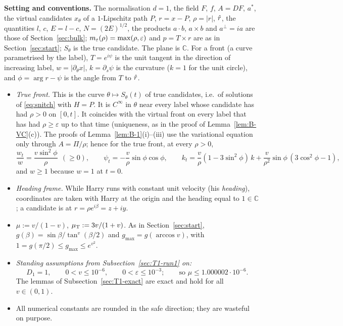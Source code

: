 \medskip\noindent\textbf{Setting and conventions.} The normalisation $d=1$, the field $F$, $f$, $A=DF$, $a^*$, the virtual candidates
$x_\theta$ of a $1$-Lipschitz path $P$, $r=x-P$, $\rho=|r|$, $\hat r$, the quantities $l$, $c$, $E=l-c$, $N=(2E)^{1/2}$, the products
$a\cdot b$, $a\times b$ and $a^\perp=ia$ are those of Section~\ref{sec:bulk}; $m_\varepsilon(\rho)=\max(\rho,\varepsilon)$ and
$p=T\times r$ are as in Section~\ref{sec:start}; $S_\theta$ is the true candidate. The plane is $\mathbb C$. For a front (a curve
parametrised by the label), $T=e^{i\psi}$ is the unit tangent in the direction of increasing label, $w=|\partial_\theta x|$,
$k=\partial_s\psi$ is the curvature ($k=1$ for the unit circle), and $\phi=\arg r-\psi$ is the angle from $T$ to $\hat r$.
\begin{itemize}
\item \emph{True front.} This is the curve $\theta\mapsto S_\theta(t)$ of true candidates, i.e.\ of solutions of \eqref{eq:snitch} with
$H=P$. It is $C^\infty$ in $\theta$ near every label whose candidate has had $\rho>0$ on $[0,t]$. It coincides with the virtual front on
every label that has had $\rho\ge\varepsilon$ up to that time (uniqueness, as in the proof of Lemma~\ref{lem:B-VC}(c)). The proofs of
Lemma~\ref{lem:B-1}(i)--(iii) use the variational equation only through $A=\Pi/\rho$; hence for the true front, at every $\rho>0$,
\begin{equation}\label{eq:T1-laws}
\frac{w_t}w=\frac{v\sin^2\!\phi}\rho\ \ (\ge0),\qquad\psi_t=-\frac v\rho\sin\phi\cos\phi,\qquad
k_t=\frac v\rho(1-3\sin^2\!\phi)\,k+\frac v{\rho^2}\sin\phi\,(3\cos^2\!\phi-1),
\end{equation}
and $w\ge1$ because $w=1$ at $t=0$.
\item \emph{Heading frame.} While Harry runs with constant unit velocity (his \emph{heading}), coordinates are taken with Harry at the
origin and the heading equal to $1\in\mathbb C$; a candidate is at $r=\rho e^{i\beta}=z+iy$.
\item $\mu:=v/(1-v)$, $\mu_{\mathrm T}:=3v/(1+v)$. As in Section~\ref{sec:start}, $g(\beta)=\sin\beta/\tan^v(\beta/2)$ and
$g_{\max}=g(\arccos v)$, with $1=g(\pi/2)\le g_{\max}\le e^{v^2}$.
\item \emph{Standing assumptions from Subsection~\ref{sec:T1-run1} on:}
\[
D_1=1,\qquad0<v\le10^{-6},\qquad0<\varepsilon\le10^{-3};\qquad\text{so }\mu\le1.000002\cdot10^{-6}.
\]
The lemmas of Subsection~\ref{sec:T1-exact} are exact and hold for all $v\in(0,1)$.
\item All numerical constants are rounded in the safe direction; they are wasteful on purpose.
\end{itemize}


